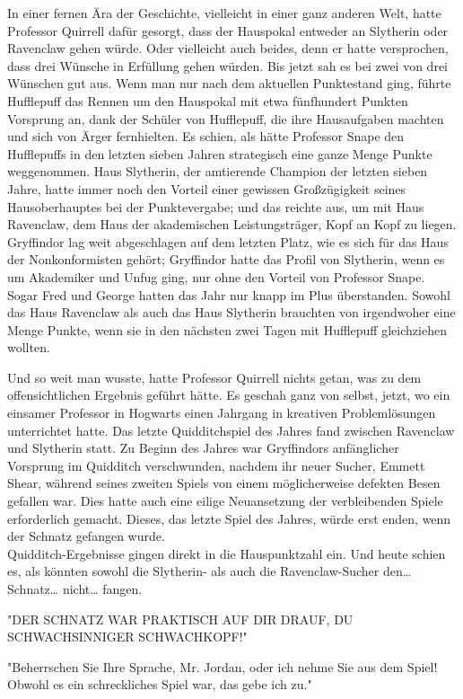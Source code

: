{In einer fernen Ära der Geschichte, vielleicht in einer ganz anderen Welt, hatte Professor Quirrell dafür gesorgt, dass der Hauspokal entweder an Slytherin oder Ravenclaw gehen würde. Oder vielleicht auch beides, denn er hatte versprochen, dass drei Wünsche in Erfüllung gehen würden. Bis jetzt sah es bei zwei von drei Wünschen gut aus. Wenn man nur nach dem aktuellen Punktestand ging, führte Hufflepuff das Rennen um den Hauspokal mit etwa fünfhundert Punkten Vorsprung an, dank der Schüler von Hufflepuff, die ihre Hausaufgaben machten und sich von Ärger fernhielten. Es schien, als hätte Professor Snape den Hufflepuffs in den letzten sieben Jahren strategisch eine ganze Menge Punkte weggenommen. Haus Slytherin, der amtierende Champion der letzten sieben Jahre, hatte immer noch den Vorteil einer gewissen Großzügigkeit seines Hausoberhauptes bei der Punktevergabe; und das reichte aus, um mit Haus Ravenclaw, dem Haus der akademischen Leistungsträger, Kopf an Kopf zu liegen. Gryffindor lag weit abgeschlagen auf dem letzten Platz, wie es sich für das Haus der Nonkonformisten gehört; Gryffindor hatte das Profil von Slytherin, wenn es um Akademiker und Unfug ging, nur ohne den Vorteil von Professor Snape. Sogar Fred und George hatten das Jahr nur knapp im Plus überstanden. Sowohl das Haus Ravenclaw als auch das Haus Slytherin brauchten von irgendwoher eine Menge Punkte, wenn sie in den nächsten zwei Tagen mit Hufflepuff gleichziehen wollten.

Und so weit man wusste, hatte Professor Quirrell nichts getan, was zu dem offensichtlichen Ergebnis geführt hätte. Es geschah ganz von selbst, jetzt, wo ein einsamer Professor in Hogwarts einen Jahrgang in kreativen Problemlösungen unterrichtet hatte. Das letzte Quidditchspiel des Jahres fand zwischen Ravenclaw und Slytherin statt. Zu Beginn des Jahres war Gryffindors anfänglicher Vorsprung im Quidditch verschwunden, nachdem ihr neuer Sucher, Emmett Shear, während seines zweiten Spiels von einem möglicherweise defekten Besen gefallen war. Dies hatte auch eine eilige Neuansetzung der verbleibenden Spiele erforderlich gemacht. Dieses, das letzte Spiel des Jahres, würde erst enden, wenn der Schnatz gefangen wurde.\\ Quidditch-Ergebnisse gingen direkt in die Hauspunktzahl ein. Und heute schien es, als könnten sowohl die Slytherin- als auch die Ravenclaw-Sucher den… Schnatz… nicht… fangen.

"DER SCHNATZ WAR PRAKTISCH AUF DIR DRAUF, DU SCHWACHSINNIGER SCHWACHKOPF!"

"Beherrschen Sie Ihre Sprache, Mr. Jordan, oder ich nehme Sie aus dem Spiel! Obwohl es ein schreckliches Spiel war, das gebe ich zu."

}
